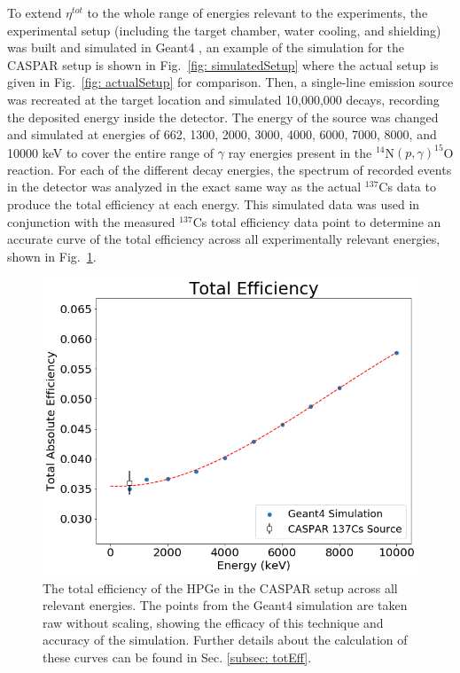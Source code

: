 To extend $\eta^{tot}$ to the whole range of energies relevant to the experiments, the experimental setup (including the target chamber, water cooling, and shielding) was built and simulated in Geant4 \cite{Agostinelli2003}, an example of the simulation for the CASPAR setup is shown in Fig.\ \ref{fig: simulatedSetup} where the actual setup is given in Fig.\ \ref{fig: actualSetup} for comparison. Then, a single-line emission source was recreated at the target location and simulated 10,000,000 decays, recording the deposited energy inside the detector. The energy of the source was changed and simulated at energies of 662, 1300, 2000, 3000, 4000, 6000, 7000, 8000, and 10000 keV to cover the entire range of $\gamma$ ray energies present in the $^{14}$N$\left( p,\gamma \right) ^{15}$O reaction. For each of the different decay energies, the spectrum of recorded events in the detector was analyzed in the exact same way as the actual $^{137}$Cs data to produce the total efficiency at each energy. This simulated data was used in conjunction with the measured $^{137}$Cs total efficiency data point to determine an accurate curve of the total efficiency across all experimentally relevant energies, shown in Fig.\ \ref{fig: totalEfficiency}.

\begin{figure}
\centering
\includegraphics[width=\linewidth]{figures/totalEfficiency.png}
\caption{The total efficiency of the HPGe in the CASPAR setup across all relevant energies. The points from the Geant4 simulation are taken raw without scaling, showing the efficacy of this technique and accuracy of the simulation. Further details about the calculation of these curves can be found in Sec. \ref{subsec: totEff}.}
\label{fig: totalEfficiency}
\end{figure}



